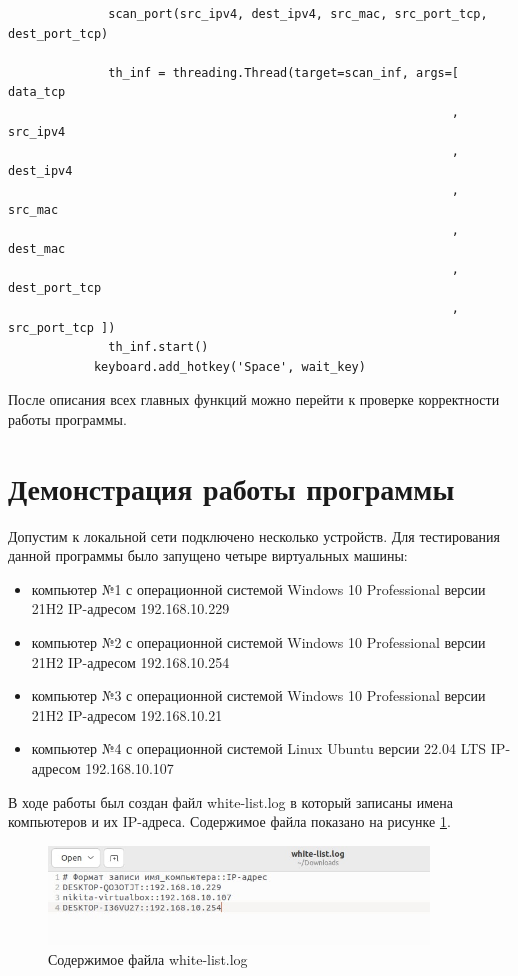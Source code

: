 \documentclass[bachelor, och, coursework]{SCWorks}
\begin{document}
\begin{verbatim}
              scan_port(src_ipv4, dest_ipv4, src_mac, src_port_tcp, dest_port_tcp)
              
              th_inf = threading.Thread(target=scan_inf, args=[ data_tcp
                                                              , src_ipv4
                                                              , dest_ipv4
                                                              , src_mac
                                                              , dest_mac
                                                              , dest_port_tcp
                                                              , src_port_tcp ])
              th_inf.start()
            keyboard.add_hotkey('Space', wait_key)
    \end{verbatim}

    После описания всех главных функций можно перейти к проверке корректности работы программы.

  \section{Демонстрация работы программы}
  Допустим к локальной сети подключено несколько устройств. Для тестирования данной программы было запущено четыре виртуальных машины:

  \begin{itemize}
    \item компьютер №1 с операционной системой Windows 10 Professional версии 21H2 IP-адресом 192.168.10.229
    \item компьютер №2 с операционной системой Windows 10 Professional версии 21H2 IP-адресом 192.168.10.254
    \item компьютер №3 с операционной системой Windows 10 Professional версии 21H2 IP-адресом 192.168.10.21
    \item компьютер №4 с операционной системой Linux Ubuntu версии 22.04 LTS IP-адресом 192.168.10.107
  \end{itemize}

  В ходе работы был создан файл white-list.log в который записаны имена компьютеров и их IP-адреса. Содержимое файла показано на
  рисунке \ref{white-list}.

  \begin{figure}[H]
    \centering
    \includegraphics[width=0.9\textwidth]{photo/white-list.png}
    \caption{Содержимое файла white-list.log}
    \label{white-list}
  \end{figure}
  
\end{document}
